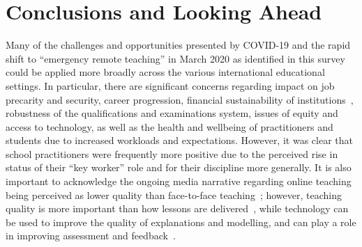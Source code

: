 \documentclass[conference]{IEEEtran}
\begin{document}

\section{Conclusions and Looking Ahead}\label{conclusions}

Many of the challenges and opportunities presented by COVID-19 and the
rapid shift to ``emergency remote teaching'' in March 2020 as identified in this
survey could be applied more broadly across the various international
educational settings. In particular, there are significant concerns
regarding impact on job precarity and security, career progression,
financial sustainability of
institutions~\cite{watermeyer-et-al:he2020}, robustness of the
qualifications and examinations system, issues of equity and access to
technology, as well as the health and wellbeing of practitioners and
students due to increased workloads and expectations. However, it was
clear that school practitioners were frequently more positive due to
the perceived rise in status of their ``key worker'' role and for
their discipline more generally. It is also important to acknowledge
the ongoing media narrative regarding online teaching being perceived
as lower quality than face-to-face
teaching~\cite{paechter+maier:ihe2010,scbbcnews:2020}; however,
teaching quality is more important than how lessons are
delivered~\cite{eefremote:2020}, while technology can be used to
improve the quality of explanations and modelling, and can play a role
in improving assessment and feedback~\cite{eefdigtech:2019}.
\end{document}

